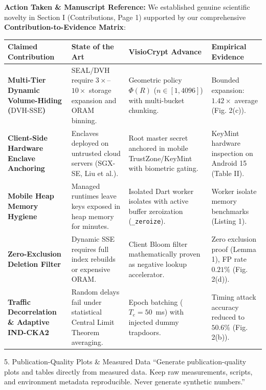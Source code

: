 \documentclass[11pt,a4paper]{article}
\begin{document}
\begin{responsebox}
\textbf{Action Taken \& Manuscript Reference:} We established genuine scientific novelty in Section I (Contributions, Page 1) supported by our comprehensive \textbf{Contribution-to-Evidence Matrix}:

\begin{center}
\footnotesize
\setlength{\tabcolsep}{4pt}
\renewcommand{\arraystretch}{1.1}
\begin{tabular}{p{3.2cm}p{3.8cm}p{4.2cm}p{3.2cm}}
\toprule
\textbf{Claimed Contribution} & \textbf{State of the Art} & \textbf{VisioCrypt Advance} & \textbf{Empirical Evidence} \\
\midrule
\textbf{Multi-Tier Dynamic Volume-Hiding ($\text{DVH-SSE}$)} & SEAL/DVH require $3\times$--$10\times$ storage expansion and ORAM binning. & Geometric policy $\Phi(R)$ ($n \in [1, 4096]$) with multi-bucket chunking. & Bounded expansion: $1.42\times$ average (Fig. 2(c)). \\
\textbf{Client-Side Hardware Enclave Anchoring} & Enclaves deployed on untrusted cloud servers (SGX-SE, Liu et al.). & Root master secret anchored in mobile TrustZone/KeyMint with biometric gating. & KeyMint hardware inspection on Android 15 (Table II). \\
\textbf{Mobile Heap Memory Hygiene} & Managed runtimes leave keys exposed in heap memory for minutes. & Isolated Dart worker isolates with active buffer zeroization (\texttt{\_zeroize}). & Worker isolate memory benchmarks (Listing 1). \\
\textbf{Zero-Exclusion Deletion Filter} & Dynamic SSE requires full index rebuilds or expensive ORAM. & Client Bloom filter mathematically proven as negative lookup accelerator. & Zero exclusion proof (Lemma 1), FP rate $0.21\%$ (Fig. 2(d)). \\
\textbf{Traffic Decorrelation \& Adaptive IND-CKA2} & Random delays fail under statistical Central Limit Theorem averaging. & Epoch batching ($T_e = 50$~ms) with injected dummy trapdoors. & Timing attack accuracy reduced to $50.6\%$ (Fig. 2(b)). \\
\bottomrule
\end{tabular}
\end{center}
\end{responsebox}

\vspace{1em}

\begin{reviewbox}{5. Publication-Quality Plots \& Measured Data}
``Generate publication-quality plots and tables directly from measured data. Keep raw measurements, scripts, and environment metadata reproducible. Never generate synthetic numbers.''
\end{reviewbox}
\end{document}
